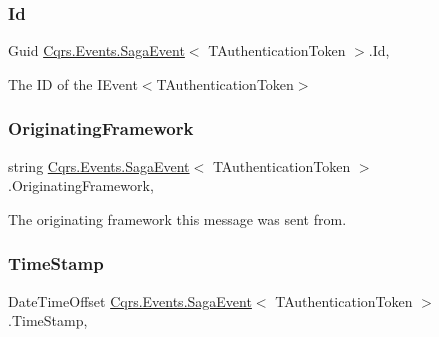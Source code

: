 \subsubsection{\texorpdfstring{Id}{Id}}
{\footnotesize\ttfamily Guid \hyperlink{classCqrs_1_1Events_1_1SagaEvent}{Cqrs.\+Events.\+Saga\+Event}$<$ T\+Authentication\+Token $>$.Id\hspace{0.3cm}{\ttfamily [get]}, {\ttfamily [set]}}



The ID of the I\+Event$<$\+T\+Authentication\+Token$>$ 

\mbox{\label{classCqrs_1_1Events_1_1SagaEvent_a58fda921f9a06762dcb7eee86390820a_a58fda921f9a06762dcb7eee86390820a}} 
\subsubsection{\texorpdfstring{Originating\+Framework}{OriginatingFramework}}
{\footnotesize\ttfamily string \hyperlink{classCqrs_1_1Events_1_1SagaEvent}{Cqrs.\+Events.\+Saga\+Event}$<$ T\+Authentication\+Token $>$.Originating\+Framework\hspace{0.3cm}{\ttfamily [get]}, {\ttfamily [set]}}



The originating framework this message was sent from. 

\mbox{\label{classCqrs_1_1Events_1_1SagaEvent_a6e522969d3456b62fe4291c5abc7e888_a6e522969d3456b62fe4291c5abc7e888}} 
\subsubsection{\texorpdfstring{Time\+Stamp}{TimeStamp}}
{\footnotesize\ttfamily Date\+Time\+Offset \hyperlink{classCqrs_1_1Events_1_1SagaEvent}{Cqrs.\+Events.\+Saga\+Event}$<$ T\+Authentication\+Token $>$.Time\+Stamp\hspace{0.3cm}{\ttfamily [get]}, {\ttfamily [set]}}



